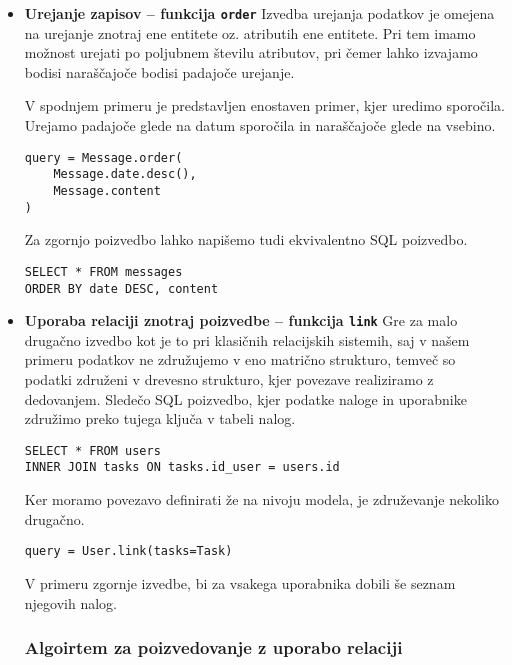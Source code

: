 \documentclass[a4paper,12pt,openright]{book}
\begin{document}
\begin{itemize}
        \item \textbf{Urejanje zapisov – funkcija {\tt order}} 
        \newline
        \noindent
        Izvedba urejanja podatkov je omejena na urejanje znotraj ene entitete oz. atributih ene entitete. Pri tem imamo možnost urejati po poljubnem številu atributov, pri čemer lahko izvajamo bodisi naraščajoče bodisi padajoče urejanje.

        V spodnjem primeru je predstavljen enostaven primer, kjer uredimo sporočila. Urejamo padajoče glede na datum sporočila in naraščajoče glede na vsebino.

\begin{verbatim}
query = Message.order(
    Message.date.desc(),
    Message.content
)
\end{verbatim}    

        \noindent
        Za zgornjo poizvedbo lahko napišemo tudi ekvivalentno SQL poizvedbo.

\begin{verbatim}
SELECT * FROM messages
ORDER BY date DESC, content
\end{verbatim}          

        \item \textbf{Uporaba relaciji znotraj poizvedbe – funkcija {\tt link}}
        \newline
        \noindent
        Gre za malo drugačno izvedbo kot je to pri klasičnih relacijskih sistemih, saj v našem primeru podatkov ne združujemo v eno matrično strukturo, temveč so podatki združeni v drevesno strukturo, kjer povezave realiziramo z dedovanjem. Sledečo SQL poizvedbo, kjer podatke naloge in uporabnike združimo preko tujega ključa v tabeli nalog.

\begin{verbatim}
SELECT * FROM users
INNER JOIN tasks ON tasks.id_user = users.id
\end{verbatim}

        \noindent
        Ker moramo povezavo definirati že na nivoju modela, je združevanje nekoliko drugačno.

\begin{verbatim}
query = User.link(tasks=Task)
\end{verbatim}

        \noindent
        V primeru zgornje izvedbe, bi za vsakega uporabnika dobili še seznam njegovih nalog.

        \subsubsection{Algoirtem za poizvedovanje z uporabo relaciji}
        \label{query_execution}


\end{itemize}
\end{document}
